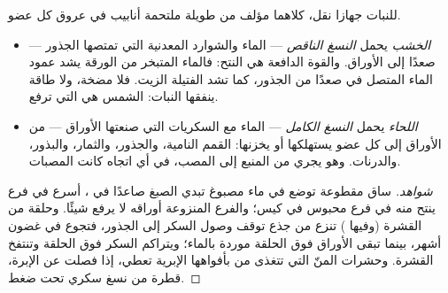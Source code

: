 \begin{proposition}[نسغان]\label{prop:g12:plant-rooted-life:saps}
للنبات جهازا نقل، كلاهما مؤلف من  طويلة ملتحمة أنابيب في عروق كل
عضو.
\begin{itemize}
  \item \emph{الخشب} يحمل \emph{النسغ الناقص} --- الماء
        والشوارد المعدنية التي تمتصها الجذور --- صعدًا إلى الأوراق.
        والقوة الدافعة هي النتح: فالماء المتبخر من  الورقة يشد
        عمود الماء المتصل في  صعدًا من الجذور، كما تشد الفتيلة
        الزيت. فلا مضخة، ولا طاقة ينفقها النبات: الشمس هي التي ترفع.
  \item \emph{اللحاء} يحمل \emph{النسغ الكامل} --- الماء
        مع السكريات التي صنعتها الأوراق --- من الأوراق إلى كل عضو
        يستهلكها أو يخزنها: القمم النامية، والجذور، والثمار، والبذور،
        والدرنات. وهو يجري من المنبع إلى المصب، في أي اتجاه كانت
        المصبات.
\end{itemize}
\end{proposition}
\begin{proof}[شواهد]
ساق مقطوعة توضع في ماء مصبوغ تبدي الصبغ صاعدًا في ، أسرع في فرع
ينتح منه في فرع محبوس في كيس؛ والفرع المنزوعة أوراقه لا يرفع شيئًا.
وحلقة من القشرة (وفيها ) تنزع من جذع توقف وصول السكر إلى
الجذور، فتجوع في غضون أشهر، بينما تبقى الأوراق فوق الحلقة موردة
بالماء؛ ويتراكم السكر فوق الحلقة وتنتفخ القشرة. وحشرات المنّ التي
تتغذى من  بأفواهها الإبرية تعطي، إذا فصلت عن الإبرة، قطرة من
نسغ سكري تحت ضغط.
\end{proof}

